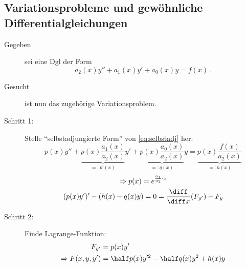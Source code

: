 	\subsection{Variationsprobleme und gewöhnliche Differentialgleichungen} %
		\begin{description}
			\item[Gegeben] sei eine Dgl der Form
				\begin{equation}\label{eq:selbstadj}
					a_2(x) y'' + a_1(x) y' + a_0(x) y = f(x) \ .
				\end{equation}
				
			\item[Gesucht] ist nun das zugehörige Variationsproblem.
		
			\item[Schritt 1:] Stelle ``selbstadjungierte Form'' von \eqref{eq:selbstadj} her:
				\[
				 p(x) y'' + \underbrace{p(x) \frac{a_1(x)}{a_2(x)}}_{=: p'(x)} y' + \underbrace{p(x) \frac{a_0(x)}{a_2(x)}}_{=: q(x)} y = \underbrace{p(x) \frac{f(x)}{a_2(x)}}_{=:h(x)}
				\]
				\begin{gather*}
					\Rightarrow p(x) = e^{\frac{a_1}{a_2} \cdot x} \\
					(p(x) y')' - (h(x) - q(x) y) = 0 = \frac{\diff}{\diff x}(F_{y'}) - F_y
				\end{gather*}
			
			\item[Schritt 2:] Finde Lagrange-Funktion:
				\begin{align*}
					F_{y'} &= p(x) y' \\
					\Rightarrow F(x,y,y') &= \half p(x) y'^2 - \half q(x) y^2 + h(x) y
				\end{align*}
				
		\end{description}
	
